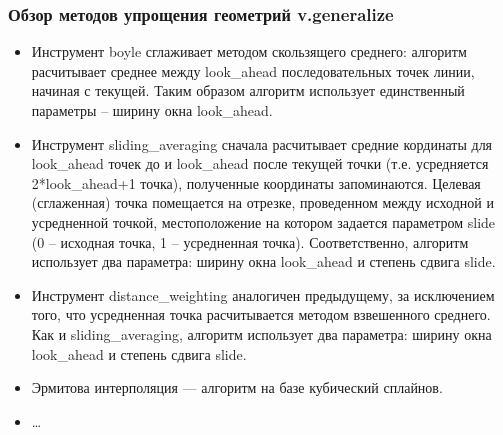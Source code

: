 \begin{frame}[allowframebreaks]
    \frametitle{Обзор методов упрощения геометрий v.generalize}
    \begin{itemize}
        \item Инструмент boyle сглаживает методом скользящего среднего: алгоритм расчитывает среднее между look\_ahead последовательных точек линии, начиная с текущей. Таким образом алгоритм использует единственный параметры -- ширину окна look\_ahead.
        \item Инструмент sliding\_averaging сначала расчитывает средние кординаты для look\_ahead точек до и look\_ahead после текущей точки (т.е. усредняется 2*look\_ahead+1 точка), полученные координаты запоминаются. Целевая (сглаженная) точка помещается на отрезке, проведенном между исходной и усредненной точкой, местоположение на котором задается параметром slide (0 -- исходная точка, 1 -- усредненная точка). Соответственно, алгоритм использует два параметра: ширину окна look\_ahead и степень сдвига slide.
        \item Инструмент distance\_weighting аналогичен предыдущему, за исключением того, что усредненная точка расчитывается методом взвешенного среднего. Как и sliding\_averaging, алгоритм использует два параметра: ширину окна look\_ahead и степень сдвига slide.
        \item Эрмитова интерполяция --- алгоритм на базе кубический сплайнов.
        \item \dots
    \end{itemize}
\end{frame}




